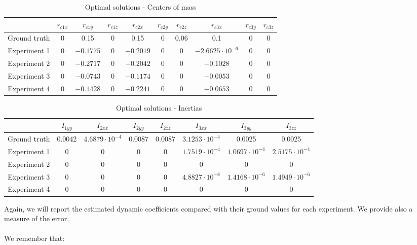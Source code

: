 \documentclass{article}
\begin{document}
\begin{table}[!htbp]
\centering
\begin{tabular}{|c|ccccccccc|}
\hline
 & $r_{c1x}$ & $r_{c1y}$ & $r_{c1z}$ & $r_{c2x}$ & $r_{c2y}$ & $r_{c2z}$ & $r_{c3x}$ & $r_{c3y}$ & $r_{c3z}$ \\
\hline
Ground truth & 0 & 0.15 & 0 & 0.15 & 0 & 0.06 & 0.1 & 0 & 0 \\
Experiment 1 & 0 & $-0.1775$ & 0 & $-0.2019$ & 0 & 0 & $-2.6625\cdot10^{-6}$ & 0 & 0\\
Experiment 2 & 0 & $-0.2717$ & 0 & $-0.2042$ & 0 & 0 & $-0.1028$ & 0 & 0 \\
Experiment 3 & 0 & $-0.0743$ & 0 & $-0.1174$ & 0 & 0 & $-0.0053$ & 0 & 0 \\
Experiment 4 & 0 & $-0.1428$ & 0 & $-0.2241$ & 0 & 0 & $-0.0653$ & 0 & 0 \\
\hline
\end{tabular}
\caption{Optimal solutions - Centers of mass}
\end{table}

\begin{table}[!htbp]
\centering
\begin{tabular}{|c|ccccccc|}
\hline
 & $I_{1yy}$ & $I_{2xx}$ & $I_{2yy}$ & $I_{2zz}$ & $I_{3xx}$ & $I_{3yy}$ & $I_{3zz}$ \\
\hline
Ground truth & 0.0042 & $4.6879\cdot 10^{-4}$ & 0.0087 & 0.0087 & $3.1253\cdot 10^{-4}$ & 0.0025  & 0.0025 \\
Experiment 1 & 0 & 0 & 0 & 0 & $1.7519\cdot 10^{-4}$ & $1.0697\cdot 10^{-4}$ & $2.5175\cdot 10^{-4}$ \\
Experiment 2 & 0 & 0 & 0 & 0 & 0 & 0 & 0 \\
Experiment 3 & 0 & 0 & 0 & 0 & $4.8827\cdot 10^{-8}$ & $1.4168\cdot 10^{-6}$ & $1.4949\cdot 10^{-6}$ \\
Experiment 4 & 0 & 0 & 0 & 0 & 0 & 0 & 0 \\
\hline
\end{tabular}
\caption{Optimal solutions - Inertias}
\end{table}

Again, we will report the estimated dynamic coefficients compared with their ground values for each experiment. We provide also a measure of the error.

\paragraph{}We remember that:
\end{document}
